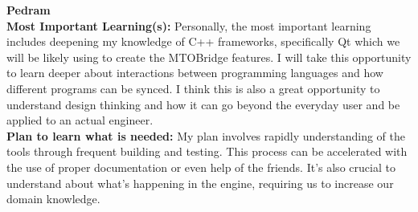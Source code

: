 \documentclass[12pt]{article}
\begin{document}
\noindent\textbf{Pedram}\\
\textbf{Most Important Learning(s):} Personally, the most important learning includes deepening my knowledge of C++ frameworks, specifically Qt which we will be likely using to create the MTOBridge features. I will take this opportunity to learn deeper about interactions between programming languages and how different programs can be synced. I think this is also a great opportunity to understand design thinking and how it can go beyond the everyday user and be applied to an actual engineer. \\
\textbf{Plan to learn what is needed:} My plan involves rapidly understanding of the tools through frequent building and testing. This process can be accelerated with the use of proper documentation or even help of the friends. It’s also crucial to understand about what’s happening in the engine, requiring us to increase our domain knowledge. \\\\
\end{document}
